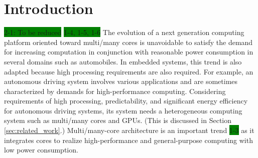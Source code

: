 \documentclass[conference,compsoc]{IEEEtran}
\begin{document}


\section{Introduction}
\colorbox{green}{2-1: To be reduced}
\colorbox{green}{1-4, 1-5, 1-6}
The evolution of a next generation computing platform oriented toward multi/many cores is unavoidable to satisfy the demand for increasing computation in conjunction with reasonable power consumption in several domains such as automobiles.
In embedded systems, this trend is also adapted because high processing requirements are also required.
For example, an autonomous driving system involves various applications and are sometimes characterized by demands for high-performance computing.
Considering requirements of high processing, predictability, and significant energy efficiency for autonomous driving systems, its system needs a heterogeneous computing system such as multi/many cores and GPUs. (This is discussed in Section \ref{sec:related_work}.)
Multi/many-core architecture is an important trend \colorbox{green}{1-3} as it integrates cores to realize high-performance and general-purpose computing with low power consumption.

\end{document}
